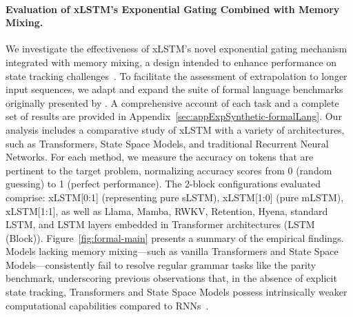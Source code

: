\paragraph{Evaluation of xLSTM's Exponential Gating Combined with Memory Mixing.} We investigate the effectiveness of xLSTM's novel exponential gating mechanism integrated with memory mixing, a design intended to enhance performance on state tracking challenges~\citep{Merrill:24, Merrill:23}. To facilitate the assessment of extrapolation to longer input sequences, we adapt and expand the suite of formal language benchmarks originally presented by \citet{Deletang:23}. A comprehensive account of each task and a complete set of results are provided in Appendix~\ref{sec:appExpSynthetic-formalLang}. Our analysis includes a comparative study of xLSTM with a variety of architectures, such as Transformers, State Space Models, and traditional Recurrent Neural Networks. For each method, we measure the accuracy on tokens that are pertinent to the target problem, normalizing accuracy scores from 0 (random guessing) to 1 (perfect performance). The 2-block configurations evaluated comprise: xLSTM[0:1] (representing pure sLSTM), xLSTM[1:0] (pure mLSTM), xLSTM[1:1], as well as Llama, Mamba, RWKV, Retention, Hyena, standard LSTM, and LSTM layers embedded in Transformer architectures (LSTM (Block)). Figure~\ref{fig:formal-main} presents a summary of the empirical findings. Models lacking memory mixing—such as vanilla Transformers and State Space Models—consistently fail to resolve regular grammar tasks like the parity benchmark, underscoring previous observations that, in the absence of explicit state tracking, Transformers and State Space Models possess intrinsically weaker computational capabilities compared to RNNs~\citep{Merrill:24, Merrill:23, Deletang:23}.

